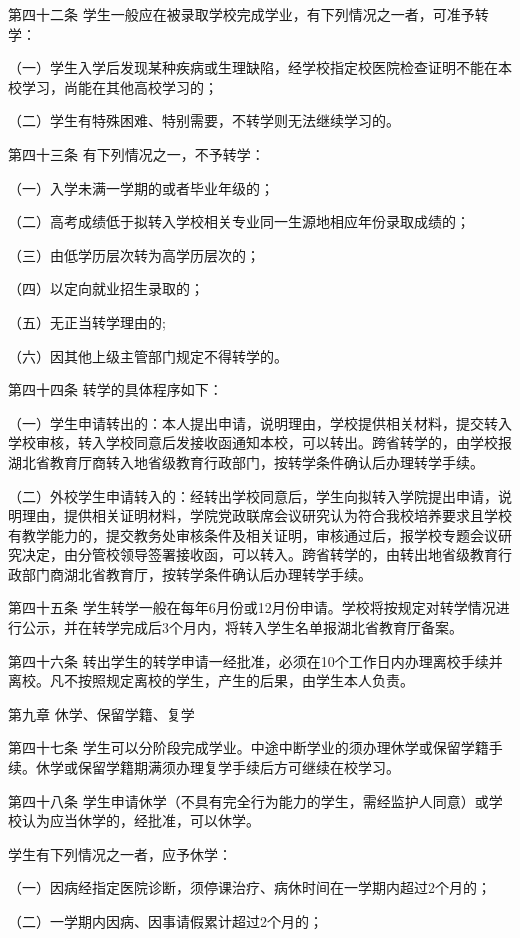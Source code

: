 \documentclass[UTF8,12pt,a4paper]{report}
\begin{document}
第四十二条  学生一般应在被录取学校完成学业，有下列情况之一者，可准予转学：

（一）学生入学后发现某种疾病或生理缺陷，经学校指定校医院检查证明不能在本校学习，尚能在其他高校学习的；　　

（二）学生有特殊困难、特别需要，不转学则无法继续学习的。

第四十三条  有下列情况之一，不予转学：

（一）入学未满一学期的或者毕业年级的；

（二）高考成绩低于拟转入学校相关专业同一生源地相应年份录取成绩的；

（三）由低学历层次转为高学历层次的；

（四）以定向就业招生录取的；

（五）无正当转学理由的;

（六）因其他上级主管部门规定不得转学的。

第四十四条  转学的具体程序如下：

（一）学生申请转出的：本人提出申请，说明理由，学校提供相关材料，提交转入学校审核，转入学校同意后发接收函通知本校，可以转出。跨省转学的，由学校报湖北省教育厅商转入地省级教育行政部门，按转学条件确认后办理转学手续。

（二）外校学生申请转入的：经转出学校同意后，学生向拟转入学院提出申请，说明理由，提供相关证明材料，学院党政联席会议研究认为符合我校培养要求且学校有教学能力的，提交教务处审核条件及相关证明，审核通过后，报学校专题会议研究决定，由分管校领导签署接收函，可以转入。跨省转学的，由转出地省级教育行政部门商湖北省教育厅，按转学条件确认后办理转学手续。

第四十五条  学生转学一般在每年6月份或12月份申请。学校将按规定对转学情况进行公示，并在转学完成后3个月内，将转入学生名单报湖北省教育厅备案。

第四十六条  转出学生的转学申请一经批准，必须在10个工作日内办理离校手续并离校。凡不按照规定离校的学生，产生的后果，由学生本人负责。

第九章  休学、保留学籍、复学

第四十七条  学生可以分阶段完成学业。中途中断学业的须办理休学或保留学籍手续。休学或保留学籍期满须办理复学手续后方可继续在校学习。

第四十八条  学生申请休学（不具有完全行为能力的学生，需经监护人同意）或学校认为应当休学的，经批准，可以休学。

学生有下列情况之一者，应予休学：

（一）因病经指定医院诊断，须停课治疗、病休时间在一学期内超过2个月的；

（二）一学期内因病、因事请假累计超过2个月的；
\end{document}
